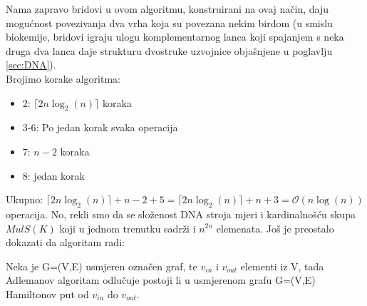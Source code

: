\documentclass[a4paper,oneside,12pt]{memoir} %
\begin{document}
\begin{spacing}{1.5}
Nama zapravo bridovi u ovom algoritmu, konstruirani na ovaj način, daju mogućnost povezivanja dva vrha koja su povezana nekim birdom (u smislu biokemije, bridovi igraju ulogu komplementarnog lanca koji  spajanjem s neka druga dva lanca daje strukturu dvostruke uzvojnice objašnjene u poglavlju \ref{sec:DNA}). \\
Brojimo korake algoritma:
\begin{itemize}
\item 2: $\lceil 2n \log _2 (n) \rceil$ koraka
\item  3-6: Po jedan korak svaka operacija
\item 7: $n-2$ koraka
\item 8: jedan korak
\end{itemize}
Ukupno: $\lceil 2n \log _2 (n) \rceil + n-2 + 5=\lceil 2n \log _2 (n) \rceil + n+3 = \mathcal{O}(n \log(n))$ operacija. No, rekli smo da se složenost DNA stroja mjeri i kardinalnošću skupa $MulS(K)$ koji u jednom trenutku sadrži i $n^{2n}$ elemenata. 
Još je preostalo dokazati da algoritam radi:
\begin{thm} Neka je G=(V,E) usmjeren označen graf, te $v_{in}$ i $v_{out}$ elementi iz V, tada Adlemanov algoritam odlučuje postoji li u usmjerenom grafu G=(V,E) Hamiltonov put od $v_{in}$ do $v_{out}$. \end{thm}


\end{spacing}
\end{document}
